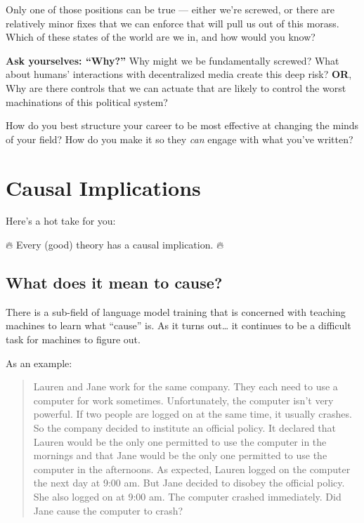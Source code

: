 \documentclass[
  letterpaper,
  DIV=11,
  numbers=noendperiod]{scrreprt}
\begin{document}
Only one of those positions can be true --- either we're screwed, or
there are relatively minor fixes that we can enforce that will pull us
out of this morass. Which of these states of the world are we in, and
how would you know?

\textbf{Ask yourselves: ``Why?''} Why might we be fundamentally screwed?
What about humans' interactions with decentralized media create this
deep risk? \textbf{OR}, Why are there controls that we can actuate that
are likely to control the worst machinations of this political system?

\begin{tcolorbox}[enhanced jigsaw, titlerule=0mm, colback=white, toptitle=1mm, toprule=.15mm, bottomtitle=1mm, colframe=quarto-callout-note-color-frame, colbacktitle=quarto-callout-note-color!10!white, bottomrule=.15mm, leftrule=.75mm, opacityback=0, title=\textcolor{quarto-callout-note-color}{\faInfo}\hspace{0.5em}{Changing Minds: Part 2}, opacitybacktitle=0.6, arc=.35mm, rightrule=.15mm, breakable, coltitle=black, left=2mm]

How do you best structure your career to be most effective at changing
the minds of your field? How do you make it so they \emph{can} engage
with what you've written?

\end{tcolorbox}


\chapter{Causal Implications}\label{causal-implications}

Here's a hot take for you:

🔥 Every (good) theory has a causal implication. 🔥

\section{What does it mean to cause?}\label{what-does-it-mean-to-cause}

There is a sub-field of language model training that is concerned with
teaching machines to learn what ``cause'' is. As it turns out\ldots{} it
continues to be a difficult task for machines to figure out.

As an example:

\begin{quote}
Lauren and Jane work for the same company. They each need to use a
computer for work sometimes. Unfortunately, the computer isn't very
powerful. If two people are logged on at the same time, it usually
crashes. So the company decided to institute an official policy. It
declared that Lauren would be the only one permitted to use the computer
in the mornings and that Jane would be the only one permitted to use the
computer in the afternoons. As expected, Lauren logged on the computer
the next day at 9:00 am. But Jane decided to disobey the official
policy. She also logged on at 9:00 am. The computer crashed immediately.
Did Jane cause the computer to crash?
\end{quote}
\end{document}
